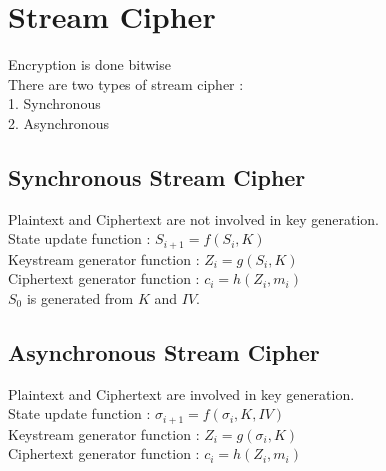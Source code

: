 \documentclass[11pt]{article}
\begin{document}
\section*{Stream Cipher}
Encryption is done bitwise \\
There are two types of stream cipher : \\
1. Synchronous \\ 2. Asynchronous

\subsection*{Synchronous Stream Cipher}
Plaintext and Ciphertext are not involved in key generation. \\
State update function : $S_{i+1} = f(S_{i},K)$ \\
Keystream generator function : $Z_{i} = g(S_{i},K)$ \\
Ciphertext generator function : $c_{i} = h(Z_{i},m_{i})$ \\
$S_{0}$ is generated from $K$ and $IV$.

\subsection*{Asynchronous Stream Cipher}
Plaintext and Ciphertext are involved in key generation. \\
State update function : $\sigma_{i+1} = f(\sigma _{i},K,IV)$ \\
Keystream generator function : $Z_{i} = g(\sigma _{i},K)$ \\
Ciphertext generator function : $c_{i} = h(Z_{i},m_{i})$ \\
\end{document}
